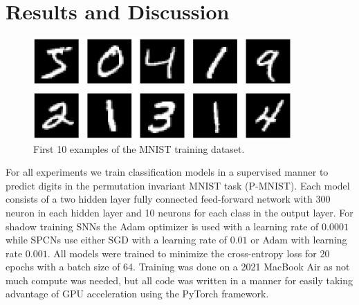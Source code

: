 \documentclass[a4paper,11pt]{article}
\begin{document}
\section{Results and Discussion}
\begin{figure}[ht]
  \centering
  \includegraphics[width=280pt]{graphics/mnist.png}  
  \caption{First 10 examples of the MNIST training dataset.}
  \label{fig:MNIST}
\end{figure}
For all experiments we train classification models in a supervised manner to predict digits in the permutation invariant MNIST task (P-MNIST). Each model consists of a two hidden layer fully connected feed-forward network with 300 neuron in each hidden layer and 10 neurons for each class in the output layer. For shadow training SNNs the Adam optimizer is used with a learning rate of $0.0001$ while SPCNs use either SGD with a learning rate of $0.01$ or Adam with learning rate $0.001$. All models were trained to minimize the cross-entropy loss for 20 epochs with a batch size of 64. Training was done on a 2021 MacBook Air as not much compute was needed, but all code was written in a manner for easily taking advantage of GPU acceleration using the PyTorch framework. 
\end{document}
